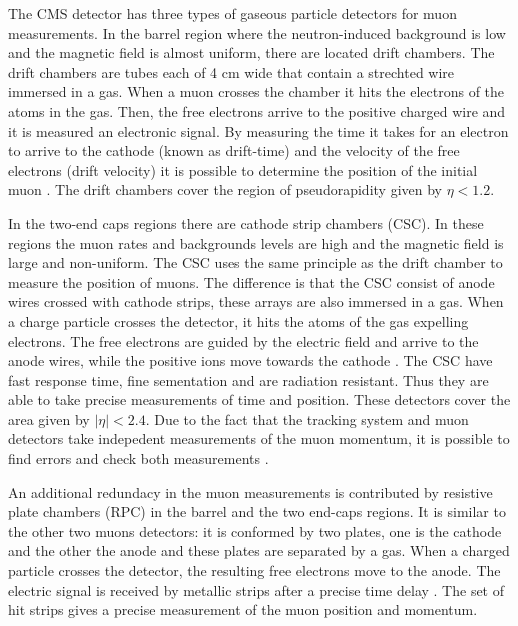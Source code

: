 The CMS detector has three types of gaseous particle detectors for muon measurements. In the barrel region where the neutron-induced background is low and the magnetic field is almost uniform, 
there are located drift chambers. The drift chambers are tubes each of 4 cm wide that contain a strechted wire immersed in a gas. When a muon crosses the chamber it hits the electrons of the atoms
in the gas. Then, the free electrons arrive to the positive charged wire and it is measured an electronic signal. By measuring the time it takes for an electron to arrive to the cathode (known as 
drift-time) and the velocity of the free electrons (drift velocity) it is possible to determine the position of the initial muon \cite{Muon_drift_tubes_cms, Particle_Detectors_Claus}. The drift chambers cover the region of pseudorapidity given by 
$\eta < 1.2$.
  
In the two-end caps regions there are cathode strip chambers (CSC). In these regions the muon rates and backgrounds levels are high and the magnetic field is large and non-uniform. The CSC uses the
same principle as the drift chamber to measure the position of muons. The difference is that the CSC consist of anode wires crossed with cathode strips, these arrays are also immersed in a gas. When
a charge particle crosses the detector, it hits the atoms of the gas expelling electrons. The free electrons are guided by the electric field and arrive to the anode wires, while the positive ions 
move towards the cathode \cite{CSC_CMS}. The CSC have fast response time, fine sementation and are radiation resistant. Thus they are able to take precise measurements of time and position. These detectors cover the
area given by $|\eta| < 2.4$. Due to the fact that the tracking system and muon detectors take indepedent measurements of the muon momentum, it is possible to find errors and check both measurements 
\cite{Perspectives_LHC}.


An additional redundacy in the muon measurements is contributed by resistive plate chambers (RPC) in the barrel and the two end-caps regions. It is similar to the other two muons detectors: it is 
conformed by two plates, one is the cathode and the other the anode and these plates are separated by a gas. When a charged particle crosses the detector, the resulting free electrons move to the anode.
The electric signal is received by metallic strips after a precise time delay \cite{RPC_CMS}. The set of hit strips gives a precise measurement of the muon position and momentum.

